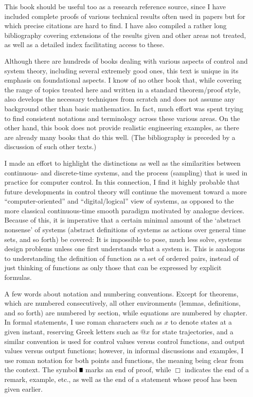 This book should be useful too as a research reference source, since I have
included complete proofs of various technical results often used in papers but
for which precise citations are hard to find.  I have also compiled a rather
long bibliography covering extensions of the results given and other areas
not treated, as well as a detailed index facilitating access to these.

Although there are hundreds of books dealing with various aspects of control
and system theory, including several extremely good ones, this text is unique
in its emphasis on foundational aspects.  I know of no other book that, while
covering the range of topics treated here and written in a standard
theorem/proof style, also develops the necessary techniques from scratch and
does not assume any background other than basic mathematics. In fact, much
effort was spent trying to find consistent notations and terminology across
these various areas.  On the other hand, this book does not provide realistic
engineering examples, as there are already many books that do this well.  (The
bibliography is preceded by a discussion of such other texts.)

I made an effort to highlight the distinctions as well as the similarities
between continuous- and discrete-time systems, and the process (sampling) that
is used in practice for computer control.  In this connection, I find it
highly probable that future developments in control theory will continue the
movement toward a more ``computer-oriented'' and ``digital/logical'' view of
systems, as opposed to the more classical continuous-time smooth paradigm
motivated by analogue devices. Because of this, it is imperative that a
certain minimal amount of the `abstract nonsense' of systems (abstract
definitions of systems as actions over general time sets, and so forth) be
covered: It is impossible to pose, much less solve, systems design problems
unless one first understands what a system is.  This is analogous to
understanding the definition of function as a set of ordered pairs, instead
of just thinking of functions as only those that can be expressed by explicit
formulas.

A few words about notation and numbering conventions.
Except for theorems, which are numbered consecutively, all other environments
(lemmas, definitions, and so forth) are numbered by section, while equations
are numbered by chapter.
In formal statements, I use roman characters such as $x$ to denote states at a
given instant, reserving Greek letters such as $@x$ for state trajectories,
and a similar convention is used for control values versus control functions,
and output values versus output functions;
however, in informal discussions and examples, I use roman notation for both
points and functions, the meaning being clear from the context.
\newcommand{\halmos}{\rule{1ex}{1.4ex}}
The symbol $\halmos$ marks an end of proof, while $\Box$ indicates
the end of a remark, example, etc., as well as the end of a statement whose
proof has been given earlier.

